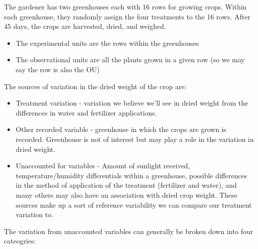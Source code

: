 \documentclass[
]{book}
\providecommand{\tightlist}{%
  \setlength{\itemsep}{0pt}\setlength{\parskip}{0pt}}
\theoremstyle{definition}
\theoremstyle{definition}
\theoremstyle{definition}
\theoremstyle{remark}
\begin{document}
The gardener has two greenhouses each with 16 rows for growing crops. Within each greenhouse, they randomly assign the four treatments to the 16 rows. After 45 days, the crops are harvested, dried, and weighed.

\begin{itemize}
\tightlist
\item
  The experimental units are the rows within the greenhouses\\
\item
  The observational units are all the plants grown in a given row (so we may say the row is also the OU)
\end{itemize}

The sources of variation in the dried weight of the crop are:

\begin{itemize}
\tightlist
\item
  Treatment variation - variation we believe we'll see in dried weight from the differences in water and fertilizer applications.\\
\item
  Other recorded variable - greenhouse in which the crops are grown is recorded. Greenhouse is not of interest but may play a role in the variation in dried weight.
\item
  Unaccounted for variables - Amount of sunlight received, temperature/humidity differentials within a greenhouse, possible differences in the method of application of the treatment (fertilizer and water), and many others may also have an association with dried crop weight. These sources make up a sort of reference variability we can compare our treatment variation to.
\end{itemize}

The variation from unaccounted variables can generally be broken down into four cateogries:
\end{document}
